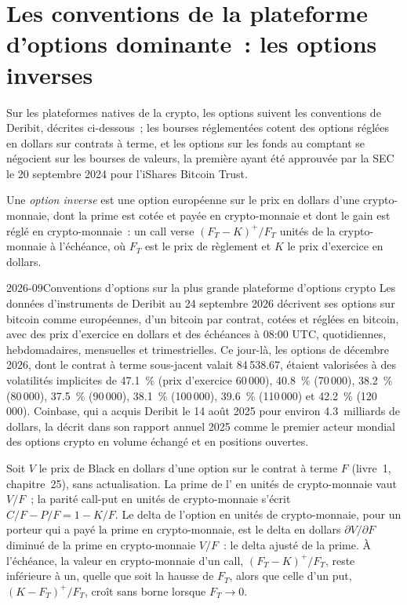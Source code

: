 \section{Les conventions de la plateforme d'options dominante~: les options inverses}

Sur les plateformes natives de la crypto, les options suivent les conventions de Deribit, décrites ci-dessous~; les bourses réglementées cotent des
options réglées en dollars sur contrats à terme, et les options sur les fonds au comptant se négocient sur les bourses de valeurs, la première ayant été approuvée par la SEC
le 20 septembre 2024 pour l'iShares Bitcoin Trust.

\begin{definition}\label{def:m3:dated-futures-options-and-etfs:inverse}
Une \emph{option inverse} est une option européenne sur le prix en dollars d'une crypto-monnaie, dont la prime est
cotée et payée en crypto-monnaie et dont le gain est réglé en crypto-monnaie~: un call verse $(F_T - K)^+/F_T$ unités de la crypto-monnaie à l'échéance, où
$F_T$ est le prix de règlement et $K$ le prix d'exercice en dollars.
\end{definition}

\begin{dated}{2026-09}{Conventions d'options sur la plus grande plateforme d'options crypto}\label{dat:m3:dated-futures-options-and-etfs:deribit}
Les données d'instruments de Deribit au 24 septembre 2026 décrivent ses options sur bitcoin comme européennes, d'un bitcoin par contrat,
cotées et réglées en bitcoin, avec des prix d'exercice en dollars et des échéances à 08:00 UTC, quotidiennes, hebdomadaires, mensuelles et trimestrielles. Ce
jour-là, les options de décembre 2026, dont le contrat à terme sous-jacent valait 84\,538.67, étaient valorisées à des volatilités implicites de
47.1~\% (prix d'exercice 60\,000), 40.8~\% (70\,000), 38.2~\% (80\,000), 37.5~\% (90\,000), 38.1~\% (100\,000), 39.6~\% (110\,000) et
42.2~\% (120\,000). Coinbase, qui a acquis Deribit le 14 août 2025 pour environ 4.3~milliards de dollars, la décrit dans son
rapport annuel 2025 comme le premier acteur mondial des options crypto en volume échangé et en positions ouvertes.
\end{dated}

\begin{proposition}\label{prop:m3:dated-futures-options-and-etfs:inverse}
Soit $V$ le prix de Black en dollars d'une option sur le contrat à terme $F$ (livre~1, chapitre~25), sans actualisation.
La prime de l' en unités de crypto-monnaie vaut $V/F$~; la parité call-put en unités de crypto-monnaie s'écrit $C/F - P/F = 1 - K/F$. Le delta de l'option en
unités de crypto-monnaie, pour un porteur qui a payé la prime en crypto-monnaie, est le delta en dollars $\partial V/\partial F$ diminué de la prime en crypto-monnaie $V/F$~: le
delta ajusté de la prime. À l'échéance, la valeur en crypto-monnaie d'un call, $(F_T - K)^+/F_T$, reste inférieure à un, quelle que soit la hausse de $F_T$,
alors que celle d'un put, $(K - F_T)^+/F_T$, croît sans borne lorsque $F_T \to 0$.
\end{proposition}

